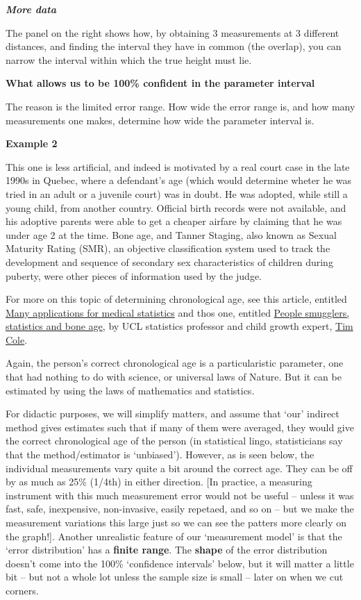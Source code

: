 \documentclass[]{book}
\begin{document}
\textbf{\emph{More data}}

The panel on the right shows how, by obtaining 3 measurements at 3 different distances, and finding the interval they have in common (the overlap), you can narrow the interval within which the true height must lie.

\textbf{What allows us to be 100\% confident in the parameter interval}

The reason is the limited error range. How wide the error range is, and how many measurements one makes, determine how wide the parameter interval is.

\textbf{Example 2}

This one is less artificial, and indeed is motivated by a real court case in the late 1990s in Quebec, where a defendant's age (which would determine wheter he was tried in an adult or a juvenile court) was in doubt. He was adopted, while still a young child, from another country. Official birth records were not available, and his adoptive parents were able to get a cheaper airfare by claiming that he was under age 2 at the time. Bone age, and Tanner Staging, also known as Sexual Maturity Rating (SMR), an objective classification system used to track the development and sequence of secondary sex characteristics of children during puberty, were other pieces of information used by the judge.

For more on this topic of determining chronological age, see this article, entitled \href{https://discovery.ucl.ac.uk/id/eprint/1470308/1/Tim_Cole_Intl_Innovation_140_Research_Media.pdf}{Many applications for medical statistics} and thos one, entitled \href{https://rss.onlinelibrary.wiley.com/doi/full/10.1111/j.1740-9713.2012.00568.x}{People smugglers, statistics and bone age}, by UCL statistics professor and child growth expert, \href{https://scholar.google.com/citations?user=1P_yQocAAAAJ\&hl=en}{Tim Cole}.

Again, the person's correct chronological age is a particularistic parameter, one that had nothing to do with science, or universal laws of Nature. But it can be estimated by using the laws of mathematics and statistics.

For didactic purposes, we will simplify matters, and assume that `our' indirect method gives estimates such that if many of them were averaged, they would give the correct chronological age of the person (in statistical lingo, statisticians say that the method/estimator is `unbiased'). However, as is seen below, the individual measurements vary quite a bit around the correct age. They can be off by as much as 25\% (1/4th) in either direction. {[}In practice, a measuring instrument with this much measurement error would not be useful -- unless it was fast, safe, inexpensive, non-invasive, easily repetaed, and so on -- but we make the measurement variations this large just so we can see the patters more clearly on the graph!{]}. Another unrealistic feature of our `measurement model' is that the `error distribution' has a \textbf{finite range}. The \textbf{shape} of the error distribution doesn't come into the 100\% `confidence intervals' below, but it will matter a little bit -- but not a whole lot unless the sample size is small -- later on when we cut corners.
\end{document}
